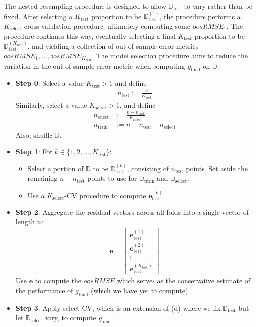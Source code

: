 \documentclass[12pt]{article}
\newcommand{\train}{\text{train}}
\newcommand{\select}{\text{select}}
\newcommand{\test}{\text{test}}
\newcommand{\Dtrain}{\mathbb{D}_\train}
\newcommand{\Dselect}{\mathbb{D}_\select}
\newcommand{\Dtest}{\mathbb{D}_\test}
\begin{document}
\begin{enumerate}

The nested resampling procedure is designed to allow $\Dtest$ to vary rather than be
fixed. After selecting a $K_\test$ proportion to be $\Dtest^{(1)}$, the procedure performs
a $K_\select$-cross validation procedure, ultimately computing some $oosRMSE_1$.
The procedure continues this way, eventually selecting a final $K_\test$ proportion
to be $\Dtest^{(K_\test)}$, and yielding a collection of out-of-sample error metrics
$oosRMSE_1,\ldots,oosRMSE_{K_\test}$. The model selection procedure aims to reduce
the variation in the out-of-sample error metric when computing $g_{\text{final}}$
on $\mathbb{D}$.


\begin{itemize}
	\item \textbf{Step 0}: Select a value $K_\test >1$ and define
	\begin{align*}
		n_\test := \frac{n}{K_\test}
	\end{align*}
	Similarly, select a value $K_\select>1$, and define
	\begin{align*}
		n_\select &:= \frac{n - n_\test}{K_\select}\\
		n_\train &:= n - n_\test - n_\select
	\end{align*}
	Also, shuffle $\mathbb{D}$.
	\item \textbf{Step 1}: For $k \in \{1,2,\ldots,K_\test\}$:
	\begin{itemize}
		\item Select a portion of $\mathbb{D}$ to be $\Dtest^{(k)}$, consisting
		of $n_\test$ points. Set aside the remaining $n - n_\test$ points
		to use for $\Dtrain$ and $\Dselect$.
		\item Use a $K_\select$-CV procedure to compute $\bm{e}_\test^{(k)}$.
	\end{itemize}
	\item \textbf{Step 2}: Aggregate the residual vectors across all folds
	into a single vector of length $n$:
	\begin{align*}
		\bm{e} = \begin{bmatrix}
			\bm{e}_\test^{(1)}\\
			\bm{e}_\test^{(2)}\\
			\vdots\\
			\bm{e}_\test^{(K_\test)}
		\end{bmatrix}
	\end{align*}
	Use $\bm{e}$ to compute the $oosRMSE$ which serves as the conservative estimate
	of the performance of $g_{\text{final}}$ (which we have yet to compute).
	\item \textbf{Step 3}: Apply select-CV, which is an extension of (d) where we fix $\Dtest$
	but let $\Dselect$ vary, to compute $g_{\text{final}}$.
\end{itemize}


\end{enumerate}
\end{document}
